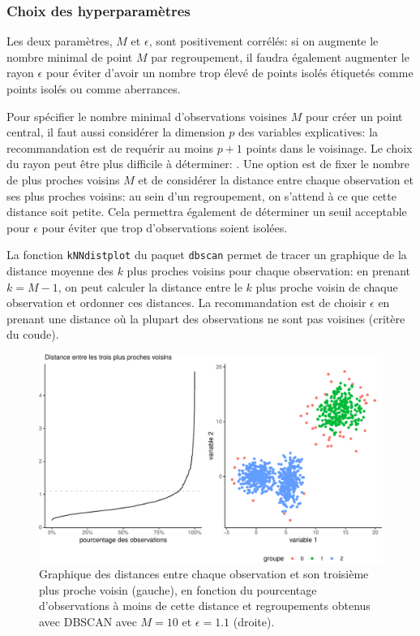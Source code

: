 \documentclass[
  11pt,
  letterpaper,
]{scrbook}
\theoremstyle{definition}
\theoremstyle{remark}
\begin{document}
\hypertarget{choix-des-hyperparamuxe8tres-1}{%
\subsubsection{Choix des
hyperparamètres}\label{choix-des-hyperparamuxe8tres-1}}

Les deux paramètres, \(M\) et \(\epsilon\), sont positivement corrélés:
si on augmente le nombre minimal de point \(M\) par regroupement, il
faudra également augmenter le rayon \(\epsilon\) pour éviter d'avoir un
nombre trop élevé de points isolés étiquetés comme points isolés ou
comme aberrances.

Pour spécifier le nombre minimal d'observations voisines \(M\) pour
créer un point central, il faut aussi considérer la dimension \(p\) des
variables explicatives: la recommandation est de requérir au moins
\(p+1\) points dans le voisinage. Le choix du rayon peut être plus
difficile à déterminer: . Une option est de fixer le nombre de plus
proches voisins \(M\) et de considérer la distance entre chaque
observation et ses plus proches voisins: au sein d'un regroupement, on
s'attend à ce que cette distance soit petite. Cela permettra également
de déterminer un seuil acceptable pour \(\epsilon\) pour éviter que trop
d'observations soient isolées.

La fonction \texttt{kNNdistplot} du paquet \texttt{dbscan} permet de
tracer un graphique de la distance moyenne des \(k\) plus proches
voisins pour chaque observation: en prenant \(k=M-1\), on peut calculer
la distance entre le \(k\) plus proche voisin de chaque observation et
ordonner ces distances. La recommandation est de choisir \(\epsilon\) en
prenant une distance où la plupart des observations ne sont pas voisines
(critère du coude).

\begin{figure}[ht!]

{\centering \includegraphics[width=1\textwidth,height=\textheight]{./03-regroupements_files/figure-pdf/fig-dbscan2-1.pdf}

}

\caption{\label{fig-dbscan2}Graphique des distances entre chaque
observation et son troisième plus proche voisin (gauche), en fonction du
pourcentage d'observations à moins de cette distance et regroupements
obtenus avec DBSCAN avec \(M=10\) et \(\epsilon=1.1\) (droite).}

\end{figure}
\end{document}
